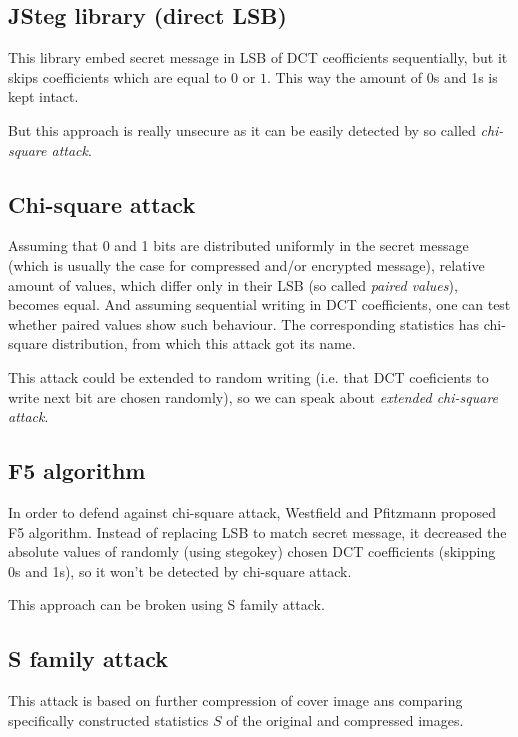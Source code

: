 \subsection{JSteg library (direct LSB)}

This library embed secret message in LSB of DCT ceofficients sequentially,
but it skips coefficients which are equal to $0$ or $1$. This way the amount
of 0s and 1s is kept intact.

But this approach is really unsecure as it can be easily detected by so called
\textit{chi-square attack}.

\subsection{Chi-square attack}

Assuming that 0 and 1 bits are distributed uniformly in the secret message 
(which is usually the case for compressed and/or encrypted message), relative
amount of values, which differ only in their LSB (so called \textit{paired values}),
becomes equal. And assuming sequential writing in DCT coefficients, one can test
whether paired values show such behaviour. The corresponding statistics has chi-square
distribution, from which this attack got its name.

This attack could be extended to random writing (i.e. that DCT coeficients to write next bit
are chosen randomly), so we can speak about \textit{extended chi-square attack}.

\subsection{F5 algorithm}

In order to defend against chi-square attack, Westfield and Pfitzmann proposed F5 algorithm.
Instead of replacing LSB to match secret message, it decreased the absolute values of randomly 
(using stegokey) chosen DCT coefficients (skipping 0s and 1s), so it won't be detected by
chi-square attack.

This approach can be broken using S family attack.

\subsection{S family attack}

This attack is based on further compression of cover image ans comparing 
specifically constructed statistics $S$ of the original and compressed images.

